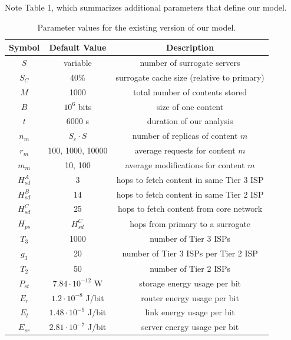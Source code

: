 \documentclass[
	a4paper, %
	10pt, %
	unnumberedsections, %
	twoside, %
]{LTJournalArticle}
\begin{document}
Note Table 1, which summarizes additional parameters that define our model.
\begin{center}
\begin{table}[h]
\scriptsize
\begin{tabular}{ |c|c|c| } 
 \hline
 Symbol & Default Value & Description \\ 
 \hline
 $S$ & variable & number of surrogate servers \\ 
 \hline
 $S_C$ & 40\% & surrogate cache size (relative to primary) \\ 
 \hline
 $M$ & 1000 & total number of contents stored \\ 
 \hline
 $B$ & $10^6$ bits & size of one content \\ 
 \hline
 $t$ & 6000 s & duration of our analysis \\ 
 \hline
 $n_m$ & $S_c \cdot S$ & number of replicas of content $m$ \\ 
 \hline
 $r_m$ & 100, 1000, 10000 & average requests for content $m$ \\ 
 \hline
 $m_m$ & 10, 100 & average modifications for content $m$ \\ 
 \hline
 $H^A_{sd}$ & 3 & hops to fetch content in same Tier 3 ISP \\ 
 \hline
 $H^B_{sd}$ & 14 & hops to fetch content in same Tier 2 ISP \\ 
 \hline
 $H^C_{sd}$ & 25 & hops to fetch content from core network \\ 
 \hline
 $H_{ps}$ & $H^C_{sd}$ & hops from primary to a surrogate \\ 
 \hline
 $T_3$ & 1000 & number of Tier 3 ISPs \\ 
 \hline
 $g_3$ & 20 & number of Tier 3 ISPs per Tier 2 ISP \\ 
 \hline
 $T_2$ & 50 & number of Tier 2 ISPs \\ 
 \hline
 $P_{st}$ & $7.84 \cdot 10^{-12}$ W & storage energy usage per bit \\ 
 \hline
 $E_r$ & $1.2 \cdot 10^{-8}$ J/bit & router energy usage per bit \\ 
 \hline
 $E_l$ & $1.48 \cdot 10^{-9}$ J/bit & link energy usage per bit \\ 
 \hline
 $E_{sr}$ & $2.81 \cdot 10^{-7}$ J/bit & server energy usage per bit \\ 
 \hline
\end{tabular}
\caption{Parameter values for the existing version of our model.}
\end{table}
\end{center}
\end{document}
